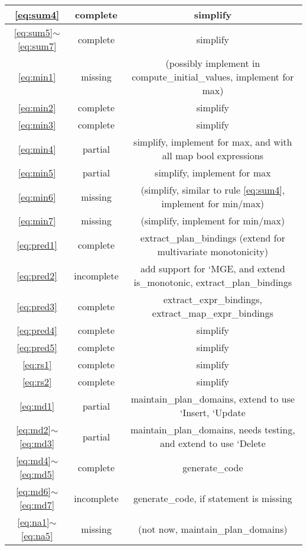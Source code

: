 \documentclass{article}
\begin{document}
\begin{tabular} {|c|c|c|}
\hline \ref{eq:sum4} & complete & simplify \\
\hline \ref{eq:sum5}$\sim$\ref{eq:sum7} & complete & simplify \\
\hline \ref{eq:min1} & missing & (possibly implement in compute\_initial\_values, implement for max)\\
\hline \ref{eq:min2} & complete & simplify \\
\hline \ref{eq:min3} & complete & simplify \\
\hline \ref{eq:min4} & partial & simplify, implement for max, and with all map bool expressions\\
\hline \ref{eq:min5} & partial & simplify, implement for max \\
\hline \ref{eq:min6} & missing & (simplify, similar to rule \ref{eq:sum4}, implement for min/max) \\
\hline \ref{eq:min7} & missing & (simplify, implement for min/max) \\
\hline \ref{eq:pred1} & complete & extract\_plan\_bindings (extend for multivariate monotonicity)\\
\hline \ref{eq:pred2} & incomplete & add support for `MGE, and extend is\_monotonic, extract\_plan\_bindings\\
\hline \ref{eq:pred3} & complete & extract\_expr\_bindings, extract\_map\_expr\_bindings\\
\hline \ref{eq:pred4} & complete & simplify \\
\hline \ref{eq:pred5} & complete & simplify \\
\hline \ref{eq:rs1} & complete & simplify \\
\hline \ref{eq:rs2} & complete & simplify \\
\hline \ref{eq:md1} & partial & maintain\_plan\_domains, extend to use `Insert, `Update\\
\hline \ref{eq:md2}$\sim$\ref{eq:md3} & partial & maintain\_plan\_domains, needs testing, and extend to use `Delete\\
\hline \ref{eq:md4}$\sim$\ref{eq:md5} & complete & generate\_code\\
\hline \ref{eq:md6}$\sim$\ref{eq:md7} & incomplete & generate\_code, if statement is missing \\
\hline \ref{eq:na1}$\sim$\ref{eq:na5} & missing & (not now, maintain\_plan\_domains) \\
\hline

\end{tabular}
\pagebreak
\end{document}
